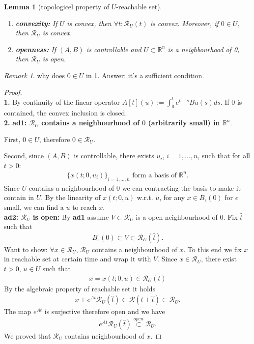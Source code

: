 \documentclass[a4paper,11pt,fleqn]{book}
\newtheorem{lemma}[theorem]{Lemma}
\theoremstyle{definition}
\theoremstyle{remark}
\newtheorem*{remark}{Remark}
\begin{document}
\begin{lemma}[topologicel property of $U$-reachable set]
\quad
	\begin{enumerate}
		\item \textbf{convexity: }If $U$ is convex, then $\forall t : \mathcal{R}_U(t)$ is convex. Moreover, if $0 \in U$, then $\mathcal{R}_U$ is convex. 
		\item \textbf{openness: }If $(A, B)$ is controllable and $U \subset \mathbb{R}^n$ is a neighbourhood of 0, then $\mathcal{R}_U$ is open. 
	\end{enumerate}
\end{lemma}
\begin{remark}
why does $0 \in U$ in 1. Answer: it's a sufficient condition. 
\end{remark}


\begin{proof}
	\quad\\
	\textbf{1.} By continuity of the linear operator $A[t](u):= \int_0^t e^{t - s} B u(s) ds$. If 0 is contained, the convex inclusion is closed. \\
	\textbf{2.} \textbf{ad1: $\mathcal{R}_U$ contains a neighbourhood of $0$ (arbitrarily small) in $\mathbb{R}^n$}. \par 
	First, $0 \in U$, therefore $0 \in \mathcal{R}_U$. \par 
	Second, since $(A, B)$ is controllable, there exists $u_i$, $i= 1, \dots, n$, such that for all $t > 0$:
	\begin{align*}
		\{x(t;0,u_i) \}_{i = 1, \dots, n} \text{ form a basis of $\mathbb{R}^n$.}
	\end{align*}
	Since $U$ contains a neighbourhood of $0$ we can contracting the basis to make it contain in $U$. By the linearity of $x(t;0, u)$ w.r.t. $u$, for any $x \in B_\epsilon(0)$ for $\epsilon$ small, we can find a $u$ to reach $x$. \\
	\textbf{ad2: $\mathcal{R}_U$ is open:} By \textbf{ad1} assume $V \subset \mathcal{R}_U$ is a open neighbourhood of $0$. Fix $\hat{t}$ such that 
	\begin{align*}
		B_\epsilon(0) \subset V \subset  \mathcal{R}_U(\hat{t}).
	\end{align*}
	Want to show: $\forall x \in \mathcal{R}_U$, $\mathcal{R}_U$ contains a neighbourhood of $x$. To this end we fix $x$ in reachable set at certain time and wrap it with $V$. Since $x \in \mathcal{R}_U$, there exist $t >0$, $u \in U$ such that
	\begin{align*}
		x = x(t; 0, u) \in \mathcal{R}_U(t)
	\end{align*}
	By the algebraic property of reachable set it holds
	\begin{align*}
		x + e^{At} \mathcal{R}_U(\hat{t}) \subset \mathcal{R}(t + \hat{t}) \subset \mathcal{R}_U. 
	\end{align*}
	The map $e^{At}$ is surjective therefore open and we have 
	\begin{align*}
		e^{At} \mathcal{R}_U(\hat{t}) \overset{open}{\subset} \mathcal{R}_U. 
	\end{align*}
	We proved that $\mathcal{R}_U$ contains neighbourhood of $x$. 
\end{proof}
\end{document}
